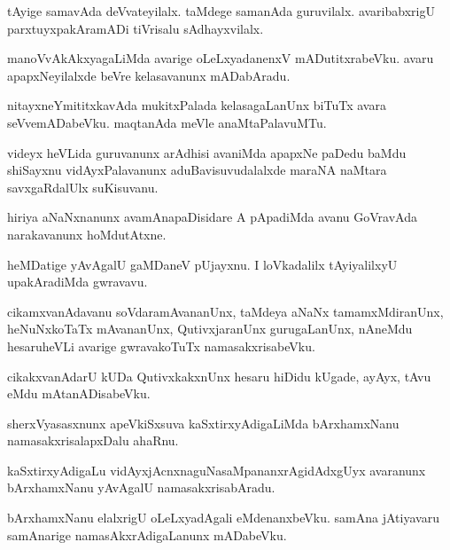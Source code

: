 \documentclass{article}
\begin{document}
\begin{mn}
tAyige samavAda deVvateyilalx. taMdege samanAda guruvilalx. avaribabxrigU parxtuyxpakAramADi
tiVrisalu sAdhayxvilalx.
\end{mn}

\begin{mn}
manoVvAkAkxyagaLiMda avarige oLeLxyadanenxV mADutitxrabeVku. avaru apapxNeyilalxde beVre 
kelasavanunx mADabAradu.
\end{mn}

\begin{mn}
nitayxneYmititxkavAda mukitxPalada kelasagaLanUnx biTuTx avara seVvemADabeVku. maqtanAda 
meVle anaMtaPalavuMTu.
\end{mn}

\begin{mn}
videyx heVLida guruvanunx arAdhisi avaniMda apapxNe paDedu baMdu shiSayxnu vidAyxPalavanunx
aduBavisuvudalalxde maraNA naMtara savxgaRdalUlx suKisuvanu.
\end{mn}

\begin{mn}
hiriya aNaNxnanunx avamAnapaDisidare A pApadiMda avanu GoVravAda narakavanunx hoMdutAtxne.
\end{mn}

\begin{mn}
heMDatige yAvAgalU gaMDaneV pUjayxnu. I loVkadalilx tAyiyalilxyU upakAradiMda gwravavu.
\end{mn}

\begin{mn}
cikamxvanAdavanu soVdaramAvananUnx, taMdeya aNaNx tamamxMdiranUnx, heNuNxkoTaTx mAvananUnx,
QutivxjaranUnx gurugaLanUnx, nAneMdu hesaruheVLi avarige gwravakoTuTx namasakxrisabeVku.
\end{mn}

\begin{mn}
cikakxvanAdarU kUDa QutivxkakxnUnx hesaru hiDidu kUgade, ayAyx, tAvu eMdu mAtanADisabeVku.
\end{mn}

\begin{mn}
sherxVyasasxnunx apeVkiSxsuva kaSxtirxyAdigaLiMda bArxhamxNanu namasakxrisalapxDalu ahaRnu.
\end{mn}

\begin{mn}
kaSxtirxyAdigaLu vidAyxjAcnxnaguNasaMpananxrAgidAdxgUyx avaranunx bArxhamxNanu yAvAgalU 
namasakxrisabAradu.
\end{mn}

\begin{mn}
bArxhamxNanu elalxrigU oLeLxyadAgali eMdenanxbeVku. samAna jAtiyavaru samAnarige 
namasAkxrAdigaLanunx mADabeVku.
\end{mn}
\end{document}

